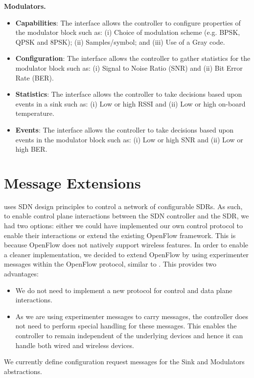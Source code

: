 \textbf{Modulators.}
\begin{itemize}
\item \textbf{Capabilities}: The interface allows the controller to configure properties of the modulator block such as:
    (i) Choice of modulation scheme (e.g. BPSK, QPSK and 8PSK);
    (ii) Samples/symbol; and
    (iii) Use of a Gray code.
\item \textbf{Configuration}: The interface allows the controller to gather statistics for the modulator block such as:
    (i) Signal to Noise Ratio (SNR) and 
    (ii) Bit Error Rate (BER).
\item \textbf{Statistics}: The interface allows the controller to take decisions based upon events in a sink such as:
    (i) Low or high RSSI and
    (ii) Low or high on-board temperature.
\item \textbf{Events}: The interface allows the controller to take decisions based upon events in the modulator block such as:
    (i) Low or high SNR and
    (ii) Low or high BER.
\end{itemize}

\section{\crossflow Message Extensions}
\label{sec:messages}
  		  
\crossflow uses SDN design principles to control a network of configurable SDRs. As such, to enable control plane interactions between the SDN controller and the SDR, we had two options: either we could have implemented our own control protocol to enable their interactions or extend the existing OpenFlow \cite{openflow} framework. This is because OpenFlow does not natively support wireless features. In order to enable a cleaner implementation, we decided to extend OpenFlow by using experimenter messages within the OpenFlow protocol, similar to \aetherflow. This provides two advantages:
\begin{itemize}
\item We do not need to implement a new protocol for control and data plane interactions.
\item As we are using experimenter messages to carry \crossflow messages, the controller does not need to perform special handling for these messages. This enables the controller to remain independent of the underlying devices and hence it can handle both wired and wireless devices. 
\end{itemize} 
We currently define configuration request messages for the Sink and Modulators abstractions.
